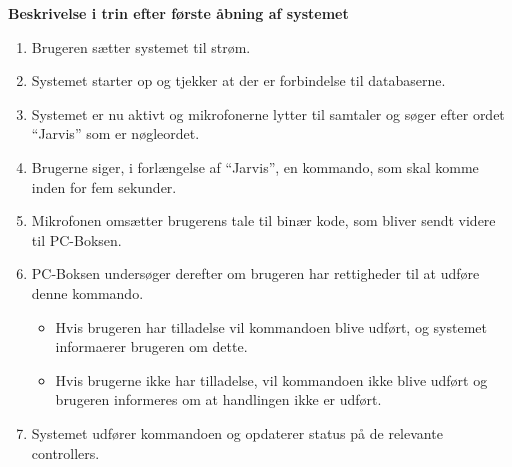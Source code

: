 {\bf Beskrivelse i trin efter første åbning af systemet}
\begin{enumerate}
    \item Brugeren sætter systemet til strøm.
    \item Systemet starter op og tjekker at der er forbindelse til databaserne.
    \item Systemet er nu aktivt og mikrofonerne lytter til samtaler og søger efter ordet “Jarvis” som er nøgleordet.
    \item Brugerne siger, i forlængelse af “Jarvis”, en kommando, som skal komme inden for fem sekunder. 

    \item Mikrofonen omsætter brugerens tale til binær kode, som bliver sendt videre til PC-Boksen.
    \item PC-Boksen undersøger derefter om brugeren har rettigheder til at udføre denne kommando.
        \begin{itemize}
            \item Hvis brugeren har tilladelse vil kommandoen blive udført, og systemet informaerer brugeren om dette.
            \item Hvis brugerne ikke har tilladelse, vil kommandoen ikke blive udført og brugeren informeres om at handlingen ikke er udført.
        \end{itemize}
    \item Systemet udfører kommandoen og opdaterer status på de relevante controllers.
\end{enumerate}